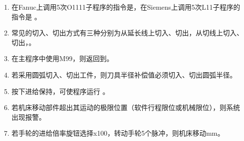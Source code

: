 \documentclass[12pt,twocolumn,landscape,UTF8,twoside]{ctexart}
\begin{document}
\begin{spacing}{1.3}
\begin{enumerate} [1、]
		\item 在Fanuc上调用5次O1111子程序的指令是，在Siemens上调用5次L11子程序的指令是	。

		
		
		
		
		\item 常见的切入、切出方式有三种分别为从延长线上切入、切出，从切线上切入、切出，。
		
		
		\item 在主程序中使用M99，则返回到。

		\item 若采用圆弧切入、切出工件，则刀具半径补偿值必须切入、切出圆弧半径。



		\item 按下进给保持，可使程序运行		。

		\item 若机床移动部件超出其运动的极限位置（软件行程限位或机械限位），则系统出现报警。


		\item 若手轮的进给倍率旋钮选择x100，转动手轮5个脉冲，则机床移动mm。
		

\end{enumerate}
\end{spacing}
\end{document}
